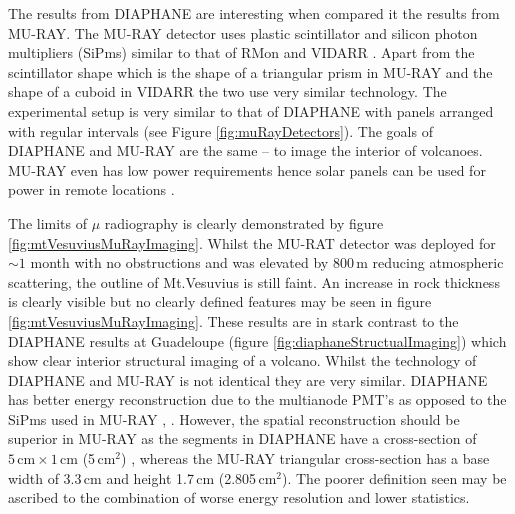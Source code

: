 The results from DIAPHANE are interesting when compared it the results from MU-RAY.
The MU-RAY detector uses plastic scintillator and silicon photon multipliers (SiPms) similar to that of RMon and VIDARR \cite{ANASTASIO2013423} \cite{Ambrosino_2014}. Apart from the scintillator shape which is the shape of a triangular prism in MU-RAY and the shape of a cuboid in VIDARR the two use very similar technology. The experimental setup is very similar to that of DIAPHANE with panels arranged with regular intervals (see Figure \ref{fig:muRayDetectors}). The goals of DIAPHANE and MU-RAY are the same -- to image the interior of volcanoes. MU-RAY even has low power requirements hence solar panels can be used for power in remote locations \cite{ANASTASIO2013423}. 


The limits of $\mu$ radiography is clearly demonstrated by figure \ref{fig:mtVesuviusMuRayImaging}. Whilst the MU-RAT detector was deployed for $\sim 1$ month with no obstructions and was elevated by 800\,m reducing atmospheric scattering, the outline of Mt.Vesuvius is still faint. An increase in rock thickness is clearly visible but no clearly defined features may be seen in figure \ref{fig:mtVesuviusMuRayImaging}. These results are in stark contrast to the DIAPHANE results at Guadeloupe (figure \ref{fig:diaphaneStructualImaging}) which show clear interior structural imaging of a volcano. Whilst the technology of DIAPHANE and MU-RAY is not identical they are very similar. DIAPHANE has better energy reconstruction due to the multianode PMT’s as opposed to the SiPms used in MU-RAY \cite{Marteau_2017}, \cite{ANASTASIO2013423}. However, the spatial reconstruction should be superior in MU-RAY as the segments in DIAPHANE have a cross-section of $5\,\textrm{cm} \times 1\,\textrm{cm}$ (5\,cm$^2$) \cite{MARTEAU201223}, whereas the MU-RAY triangular cross-section has a base width of 3.3\,cm and height 1.7\,cm (2.805\,cm$^2$). The poorer definition seen may be ascribed to the combination of worse energy resolution and lower statistics. %

